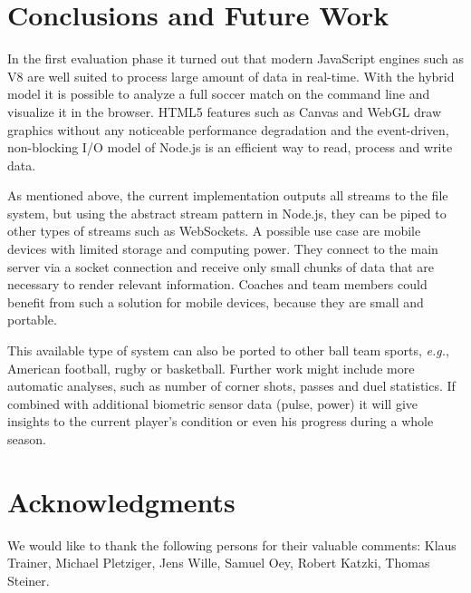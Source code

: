 \documentclass{sig-alternate}
\begin{document}
\section{Conclusions and Future Work}
\label{sec:conclusions-future-work}

In the first evaluation phase it turned out
that modern JavaScript engines such as V8
are well suited to process large amount of data in real-time.
With the hybrid model it is possible to analyze a full soccer match
on the command line and visualize it in the browser.
HTML5 features such as Canvas and WebGL draw graphics
without any noticeable performance degradation
and the event-driven, non-blocking I/O model of Node.js
is an efficient way to read, process and write data.

As mentioned above, the current implementation
outputs all streams to the file system,
but using the abstract stream pattern in Node.js,
they can be piped to other types of streams such as WebSockets.
A possible use case are mobile devices with limited storage
and computing power.
They connect to the main server via a socket connection
and receive only small chunks of data that are necessary
to render relevant information.
Coaches and team members could benefit from such a solution
for mobile devices, because they are small and portable.

This available type of system can also be ported
to other ball team sports, \emph{e.g.}, American football,
rugby or basketball.
Further work might include more automatic analyses,
such as number of corner shots, passes and duel statistics.
If combined with additional biometric sensor data (pulse, power)
it will give insights to the current player’s condition
or even his progress during a whole season.

\section*{Acknowledgments}
We would like to thank the following persons for their valuable comments: Klaus Trainer, Michael Pletziger, Jens Wille, Samuel Oey, Robert Katzki, Thomas Steiner.



\end{document}
